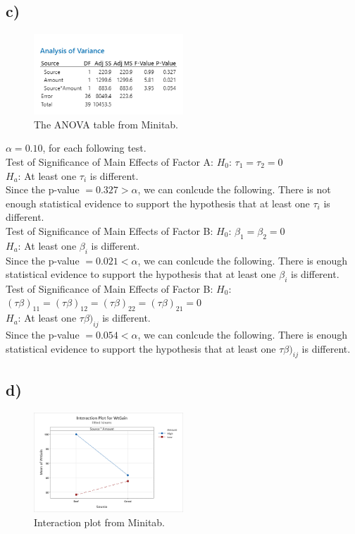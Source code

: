 \documentclass{article}
\begin{document}
\subsection*{c)}
\begin{figure}[h]
    \centering
    \includegraphics[width=0.5\textwidth]{./images/1_c.png}
    \caption{The ANOVA table from Minitab.}
    \label{fig:1_c}
  \end{figure}

$\alpha = 0.10$, for each following test. \\
Test of Significance of Main Effects of Factor A:
$H_0$: $\tau_1 = \tau_2 = 0$ \\
$H_a$: At least one $\tau_i$ is different.\\

Since the p-value $= 0.327 > \alpha$, we can conlcude the following.
There is not enough statistical evidence to support the hypothesis
that at least one $\tau_i$ is different.
\\
Test of Significance of Main Effects of Factor B:
$H_0$: $\beta_1 = \beta_2 = 0$ \\
$H_a$: At least one $\beta_i$ is different.\\

Since the p-value $= 0.021 < \alpha$, we can conlcude the following.
There is enough statistical evidence to support the hypothesis
that at least one $\beta_i$ is different.
\\
Test of Significance of Main Effects of Factor B:
$H_0$: $(\tau \beta)_{11} = (\tau \beta)_{12} = (\tau \beta)_{22} = (\tau \beta)_{21} = 0$ \\
$H_a$: At least one $\tau \beta)_{ij}$ is different.\\

Since the p-value $= 0.054 < \alpha$, we can conlcude the following.
There is enough statistical evidence to support the hypothesis
that at least one $\tau \beta)_{ij}$ is different.


\subsection*{d)}
\begin{figure}[h]
    \centering
    \includegraphics[width=0.5\textwidth]{./images/1_d.png}
    \caption{Interaction plot from Minitab.}
    \label{fig:1_d}
  \end{figure}
\end{document}
